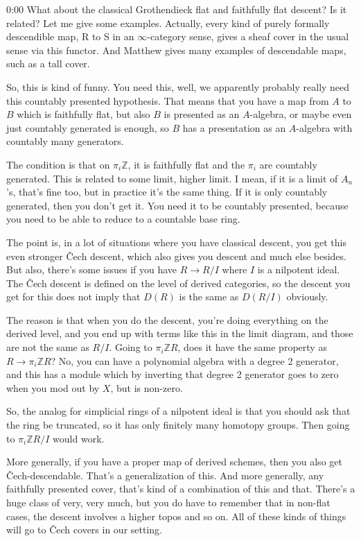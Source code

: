 \begin{unfinished}{0:00}
What about the classical Grothendieck flat and faithfully flat descent? Is it related? Let me give some examples. Actually, every kind of purely formally descendible map, R to S in an $\infty$-category sense, gives a sheaf cover in the usual sense via this functor. And Matthew gives many examples of descendable maps, such as a tall cover.

So, this is kind of funny. You need this, well, we apparently probably really need this countably presented hypothesis. That means that you have a map from $A$ to $B$ which is faithfully flat, but also $B$ is presented as an $A$-algebra, or maybe even just countably generated is enough, so $B$ has a presentation as an $A$-algebra with countably many generators.

The condition is that on $\pi_i \mathbb{Z}$, it is faithfully flat and the $\pi_i$ are countably generated. This is related to some limit, higher limit. I mean, if it is a limit of $A_n$'s, that's fine too, but in practice it's the same thing. If it is only countably generated, then you don't get it. You need it to be countably presented, because you need to be able to reduce to a countable base ring.

The point is, in a lot of situations where you have classical descent, you get this even stronger Čech descent, which also gives you descent and much else besides. But also, there's some issues if you have $R \to R/I$ where $I$ is a nilpotent ideal. The Čech descent is defined on the level of derived categories, so the descent you get for this does not imply that $D(R)$ is the same as $D(R/I)$ obviously.

The reason is that when you do the descent, you're doing everything on the derived level, and you end up with terms like this in the limit diagram, and those are not the same as $R/I$. Going to $\pi_i \mathbb{Z}R$, does it have the same property as $R \to \pi_i \mathbb{Z}R$? No, you can have a polynomial algebra with a degree 2 generator, and this has a module which by inverting that degree 2 generator goes to zero when you mod out by $X$, but is non-zero.

So, the analog for simplicial rings of a nilpotent ideal is that you should ask that the ring be truncated, so it has only finitely many homotopy groups. Then going to $\pi_i \mathbb{Z}R/I$ would work.

More generally, if you have a proper map of derived schemes, then you also get Čech-descendable. That's a generalization of this. And more generally, any faithfully presented cover, that's kind of a combination of this and that. There's a huge class of very, very much, but you do have to remember that in non-flat cases, the descent involves a higher topos and so on. All of these kinds of things will go to Čech covers in our setting.


\end{unfinished}
